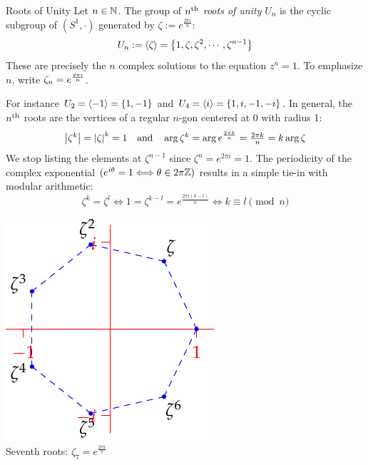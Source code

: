 


\begin{defn}{Roots of Unity}{}
	Let $n\in\mathbb{N}$. The group of \emph{$n\textsuperscript{th}$ roots of unity} $U_n$ is the cyclic subgroup of $(S^1,\cdot)$ generated by $\zeta:=e^{\frac{2\pi i}n}$:
	\[
		U_n:=\left\langle \zeta\right\rangle=\bigl\{1,\zeta,\zeta^2,\cdots,\zeta^{n-1}\bigr\}
	\]
	These are precisely the $n$ complex solutions to the equation $z^n=1$. To emphasize $n$, write $\zeta_n=\smash[t]{e^{\frac{2\pi i}n}}$. 
\end{defn}

\begin{minipage}[t]{0.75\linewidth}\vspace{-5pt}
	For instance $U_2=\left\langle -1\right\rangle=\{1,-1\}$ and $U_4=\left\langle i\right\rangle=\{1,i,-1,-i\}$. In general, the $n\textsuperscript{th}$ roots are the vertices of a regular $n$-gon centered at 0 with radius 1:
	\[
		\left| \zeta^k\right|=\left| \zeta\right|^k=1
		\quad\text{and}\quad
		\arg\zeta^k=\arg e^{\frac{2\pi k}{n}}=\tfrac{2\pi k}n=k\arg\zeta
	\]
	We stop listing the elements at $\zeta^{n-1}$ since $\zeta^n=e^{2\pi i}=1$. The periodicity of the complex exponential $(e^{i\theta}=1\Longleftrightarrow \theta\in 2\pi\mathbb{Z})$ results in a simple tie-in with modular arithmetic:
	\[
		\zeta^k=\zeta^l\iff 1=\zeta^{k-l}=e^{\frac{2\pi i(k-l)}n}\iff k\equiv l\pmod n
	\]
\end{minipage}
\hfill
\begin{minipage}[t]{0.24\linewidth}\vspace{-5pt}
	\centering
	\includegraphics[scale=0.8]{cyclic-rootunity}\\
	Seventh roots: $\zeta_7=e^{\frac{2\pi i}7}$
\end{minipage}
\bigbreak

